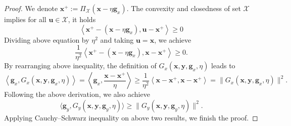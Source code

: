 \documentclass[10pt,a4paper]{amsart}
\def\fX{{\mathcal{X}}}
\def\vg{\mathbf{g}}
\def\vu{\mathbf{u}}
\def\vx{\mathbf{x}}
\def\vy{\mathbf{y}}
\begin{document}
\begin{proof}
We denote $\vx^+ := {\Pi}_\fX\left(\vx - \eta \vg_x\right)$. 
The convexity and closedness of set $\fX$ implies for all $\vu \in \fX$, it holds
\begin{equation*}
    \left\langle \vx^+ - (\vx - \eta \vg_x), \vu - \vx^+ \right\rangle \geq 0
\end{equation*}
Dividing above equation by $\eta^2$ and taking $\vu = \vx$, we achieve
\begin{equation*}
    \frac{1}{\eta^2}\left\langle \vx^+ - (\vx - \eta \vg_x), \vx - \vx^+ \right\rangle \geq 0.
\end{equation*}
By rearranging above inequality, the definition of $G_x(\vx,\vy, \vg_x, \eta)$ leads to
\begin{equation*}
\left\langle \vg_x, G_x(\vx,\vy, \vg_x, \eta) \right\rangle  
= \left\langle \vg_x, \frac{\vx - \vx^+}{\eta} \right\rangle  
\geq \frac{1}{\eta^2}\left\langle \vx- \vx^+  , \vx - \vx^+\right\rangle  
= \|G_x(\vx,\vy, \vg_x, \eta)\|^2.
\end{equation*}
Following the above derivation, we also achieve
\[
\langle \vg_y, G_y(\vx,\vy, \vg_y, \eta) \rangle \geq \|G_y(\vx,\vy, \vg_y, \eta)\|^2.
\]
Applying Cauchy--Schwarz inequality on above two results, we finish the proof.
\end{proof}
\end{document}
